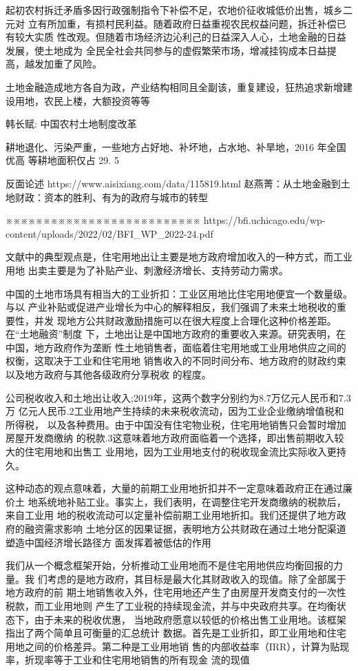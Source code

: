 起初农村拆迁矛盾多因行政强制指令下补偿不足，农地价征收城低价出售，城乡二元对
立有所加重，有损村民利益。随着政府日益重视农民权益问题，拆迁补偿已有较大实质
性改观。但随着市场经济边沁利己的日益深入人心，土地金融的日益发展，使土地成为
全民全社会共同参与的虚假繁荣市场，增减挂钩成本日益提高，越发加重了风险。


土地金融造成地方各自为政，产业结构相同且全副该，重复建设，狂热追求新增建设用地，农民上楼，大额投资等等


韩长赋: 中国农村土地制度改革

耕地退化、污染严重，一些地方占好地、补坏地，占水地、补旱地，2016 年全国优高
等耕地面积仅占 29. 5%




反面论述
https://www.aisixiang.com/data/115819.html
赵燕菁：从土地金融到土地财政：资本的胜利、有为的政府与城市的转型

※※※※※※※※※※※※※※※※※※※※※※※※※※
https://bfi.uchicago.edu/wp-content/uploads/2022/02/BFI_WP_2022-24.pdf

文献中的典型观点是，住宅用地出让主要是地方政府增加收入的一种方式，而工业用地
出卖主要是为了补贴产业、刺激经济增长、支持劳动力需求。

中国的土地市场具有相当大的工业折扣：工业区用地比住宅用地便宜一个数量级。与以
产业补贴或促进产业增长为中心的解释相反，我们强调了未来土地税收的重要性，并发
现地方公共财政激励措施可以在很大程度上合理化这种价格差距。在“土地融资”制度
下，土地出让是中国地方政府的重要收入来源。研究表明，在中国，地方政府作为垄断
性土地销售者，面临着住宅用地或工业用地供应之间的权衡，这取决于工业和住宅用地
销售收入的不同时间分布、地方政府的财政约束以及地方政府与其他各级政府分享税收
的程度。

公司税收收入和土地出让收入;2019年，这两个数字分别约为8.7万亿元人民币和7.3万
亿元人民币.2工业用地产生持续的未来税收流动，因为工业企业缴纳增值税和所得税，
以及各种费用。由于中国没有住宅物业税，住宅用地销售只会暂时增加房屋开发商缴纳
的税款.3这意味着地方政府面临着一个选择，即出售前期收入较大的住宅用地和出售工
业用地，因为工业用地支付的税收现金流比实际收入更持久。

这种动态的观点意味着，大量的前期工业用地折扣并不一定意味着政府正在通过廉价土
地系统地补贴工业。事实上，我们表明，在调整住宅开发商缴纳的税款后，来自工业用
地的税收流动可以定量补偿前期工业用地折扣。我们还提供了地方政府的融资需求影响
土地分区的因果证据，表明地方公共财政在通过土地分配渠道塑造中国经济增长路径方
面发挥着被低估的作用

我们从一个概念框架开始，分析推动工业用地而不是住宅用地供应均衡回报的力量。我
们考虑的是地方政府，其目标是最大化其财政收入的现值。除了全部属于地方政府的前
期土地销售收入外，住宅用地还产生了由房屋开发商支付的一次性税款，而工业用地则
产生了工业税的持续现金流，并与中央政府共享。在均衡状态下，由于未来的税收优惠，
当地政府愿意以较低的价格出售工业用地。该框架指出了两个简单且可衡量的汇总统计
数据。首先是工业折扣，即工业用地和住宅用地之间的价格差异。第二种是工业用地销
售的内部收益率（IRR），计算为贴现率，折现率等于工业和住宅用地销售的所有现金
流的现值

